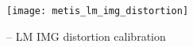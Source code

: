 \begin{figure}[hb]
  \centering
  \texttt{[image: metis\_lm\_img\_distortion]}
  \caption[Recipe: ]{%
    \hyperref[rec:metis_lm_img_distortion]{} -- LM IMG distortion calibration}
  \label{fig:metis_lm_img_distortion}
\end{figure}

\FloatBarrier

